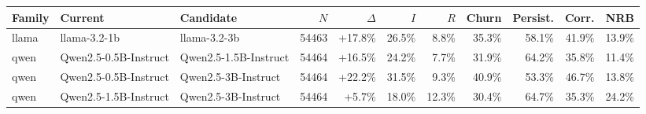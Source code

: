 \begin{tabular}{lllrrrrrrrr}
\toprule
Family & Current & Candidate & $N$ & $\Delta$ & $I$ & $R$ & Churn & Persist. & Corr. & NRB \\
\midrule
llama & llama-3.2-1b & llama-3.2-3b & 54463 & +17.8\% & 26.5\% & 8.8\% & 35.3\% & 58.1\% & 41.9\% & 13.9\% \\
qwen & Qwen2.5-0.5B-Instruct & Qwen2.5-1.5B-Instruct & 54464 & +16.5\% & 24.2\% & 7.7\% & 31.9\% & 64.2\% & 35.8\% & 11.4\% \\
qwen & Qwen2.5-0.5B-Instruct & Qwen2.5-3B-Instruct & 54464 & +22.2\% & 31.5\% & 9.3\% & 40.9\% & 53.3\% & 46.7\% & 13.8\% \\
qwen & Qwen2.5-1.5B-Instruct & Qwen2.5-3B-Instruct & 54464 & +5.7\% & 18.0\% & 12.3\% & 30.4\% & 64.7\% & 35.3\% & 24.2\% \\
\bottomrule
\end{tabular}
